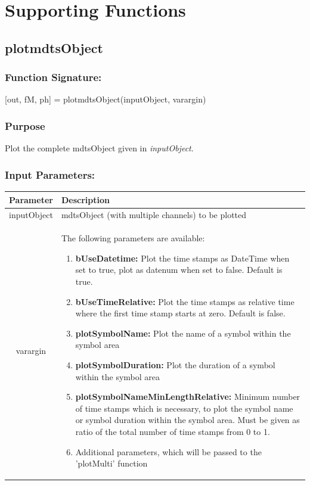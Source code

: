 \documentclass[a4]{scrreprt}
\begin{document}
\section{Supporting Functions}

\subsection{plotmdtsObject}

\subsubsection{Function Signature:}

\begin{center}
	[out, fM, ph] = plotmdtsObject(inputObject, varargin)
\end{center}

\subsubsection{Purpose}

Plot the complete mdtsObject given in \textit{inputObject}.

\subsubsection{Input Parameters:}

\begin{longtabu} to \textwidth {|c|X|}
	\hline
	\textbf{Parameter} & \textbf{Description} \\ \hline
	\endhead
	inputObject & mdtsObject (with multiple channels) to be plotted \\ \hline
	varargin & The following parameters are available:
	\begin{enumerate}
		\item \textbf{bUseDatetime:} Plot the time stamps as DateTime when set to true, plot as datenum when set to false. Default is true.
		\item \textbf{bUseTimeRelative:} Plot the time stamps as relative time where the first time stamp starts at zero. Default is false.
		\item \textbf{plotSymbolName:} Plot the name of a symbol within the symbol area
		\item \textbf{plotSymbolDuration:} Plot the duration of a symbol within the symbol area
		\item \textbf{plotSymbolNameMinLengthRelative:} Minimum number of time stamps which is necessary, to plot the symbol name or symbol duration within the symbol area. Must be given as ratio of the total number of time stamps from 0 to 1.
		\item Additional parameters, which will be passed to the 'plotMulti' function
	\end{enumerate} \\ \hline
\end{longtabu}
\end{document}

